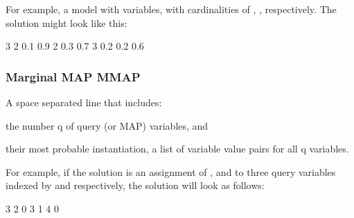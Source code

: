 For example, a model with {} variables, with cardinalities of {}, {}, {} respectively. The solution might look like this\+: \begin{DoxyVerb}    3 2 0.1 0.9 2 0.3 0.7 3 0.2 0.2 0.6
\end{DoxyVerb}


\subsubsection*{Marginal M\+AP {\ttfamily M\+M\+AP}}

A space separated line that includes\+:
\begin{DoxyItemize}
\item the number {\ttfamily q} of query (or M\+AP) variables, and
\item their most probable instantiation, a list of variable value pairs for all {\ttfamily q} variables.
\end{DoxyItemize}

For example, if the solution is an assignment of {}, {} and {} to three query variables indexed by {} {} and {} respectively, the solution will look as follows\+: \begin{DoxyVerb}    3 2 0 3 1 4 0 \end{DoxyVerb}
 